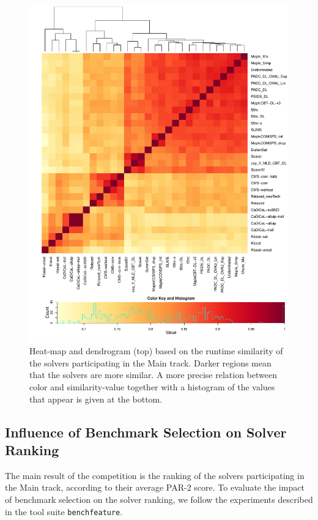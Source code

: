 \documentclass{elsarticle}
\begin{document}
\begin{figure}[tp]
    \centering
    \includegraphics[width=\textwidth]{similarity/cross.pdf}
    \caption{Heat-map and dendrogram (top) based on the runtime similarity of the solvers participating in the Main track.
      Darker regions mean that the solvers are more similar.
      A more precise relation between color and similarity-value together with a histogram of the values that appear is given at the bottom.
    }
    \label{fig-similarity-main}
\end{figure}

\subsection{Influence of Benchmark Selection on Solver Ranking}
The main result of the competition is the ranking of the solvers participating
in the Main track, according to their average PAR-2 score. To evaluate the impact
of benchmark selection on the solver ranking, we follow the experiments
described in the tool suite
\texttt{benchfeature}\cite{benchfeature}.
\end{document}
